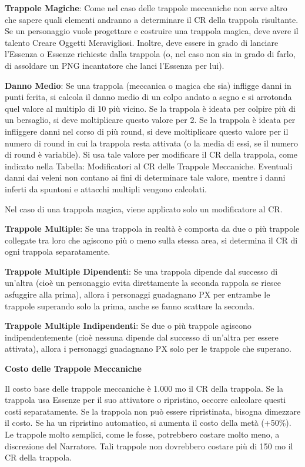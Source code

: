 \documentclass[a4paper,11pt,twoside,openany]{book}
\begin{document}
\textbf{Trappole Magiche}: Come nel caso delle trappole meccaniche non serve altro che sapere quali elementi andranno a determinare il CR della trappola risultante. Se un personaggio vuole progettare e costruire una trappola magica, deve avere il talento Creare Oggetti Meravigliosi. Inoltre, deve essere in grado di lanciare l'Essenza o Essenze richieste dalla trappola (o, nel caso non sia in grado di farlo, di assoldare un PNG incantatore che lanci l'Essenza per lui).

\textbf{Danno Medio}: Se una trappola (meccanica o magica che sia) infligge danni in punti ferita, si calcola il danno medio di un colpo andato a segno e si arrotonda quel valore al multiplo di 10 più vicino. Se la trappola è ideata per colpire più di un bersaglio, si deve moltiplicare questo valore per 2. Se la trappola è ideata per infliggere danni nel corso di più round, si deve moltiplicare questo valore per il numero di round in cui la trappola resta attivata (o la media di essi, se il numero di round è variabile). Si usa tale valore per modificare il CR della trappola, come indicato nella Tabella: Modificatori al CR delle Trappole Meccaniche. Eventuali danni dai veleni non contano ai fini di determinare tale valore, mentre i danni inferti da spuntoni e attacchi multipli vengono calcolati.

Nel caso di una trappola magica, viene applicato solo un modificatore al CR.

\textbf{Trappole Multiple}: Se una trappola in realtà è composta da due o più trappole collegate tra loro che agiscono più o meno sulla stessa area, si determina il CR di ogni trappola separatamente.

\textbf{Trappole Multiple Dipendent}i: Se una trappola dipende dal successo di un'altra (cioè un personaggio evita direttamente la seconda rappola se riesce asfuggire alla prima), allora i personaggi guadagnano PX per entrambe le trappole superando solo la prima, anche se fanno scattare la seconda.

\textbf{Trappole Multiple Indipendenti}: Se due o più trappole agiscono indipendentemente (cioè nessuna dipende dal successo di un'altra per essere attivata), allora i personaggi guadagnano PX solo per le trappole
che superano.

\textbf{Costo delle Trappole Meccaniche}

Il costo base delle trappole meccaniche è 1.000 mo \texttimes{} il CR della trappola. Se la trappola usa Essenze per il suo attivatore o ripristino, occorre calcolare questi costi separatamente. Se la trappola non può essere ripristinata, bisogna dimezzare il costo. Se ha un ripristino automatico, si aumenta il costo della metà (+50\%). Le trappole molto semplici, come le fosse, potrebbero costare molto meno, a discrezione del Narratore. Tali trappole non dovrebbero costare più di 150 mo \texttimes{} il CR della trappola.
\end{document}
